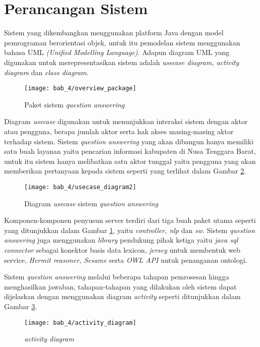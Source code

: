 \section{Perancangan Sistem}
Sistem yang dikembangkan menggunakan platform Java dengan model pemrograman berorientasi objek, untuk itu pemodelan sistem menggunakan bahasa UML \emph{(Unified Modelling Language)}. Adapun diagram UML yang digunakan untuk merepresentasikan sistem adalah \emph{usecase diagram, activity diagram} dan \emph{class diagram}.

\begin{figure}[hb]
    \centering
    \texttt{[image: bab\_4/overview\_package]}
    \caption{Paket sistem \emph{question answering}}
    \label{fig:overview_package}
\end{figure}

Diagram \emph{usecase} digunakan untuk menunjukkan interaksi sistem dengan aktor atau pengguna, berapa jumlah aktor serta hak akses masing-masing aktor terhadap sistem. Sistem \emph{question answering} yang akan dibangun hanya memiliki satu buah layanan yaitu pencarian informasi kabupaten di Nusa Tenggara Barat, untuk itu sistem hanya melibatkan satu aktor tunggal yaitu pengguna yang akan memberikan pertanyaan kepada sistem seperti yang terlihat dalam Gambar \ref{fig:usecase_diagram}.

\begin{figure}[ht]
    \centering
    \texttt{[image: bab\_4/usecase\_diagram2]}
    \caption{Diagram \emph{usecase} sistem \emph{question answering}}
    \label{fig:usecase_diagram}
\end{figure}

Komponen-komponen penyusun server terdiri dari tiga buah paket utama seperti yang ditunjukkan dalam Gambar \ref{fig:overview_package}, yaitu \emph{controller, nlp} dan \emph{sw}. Sistem \emph{question answering} juga menggunakan \emph{library} pendukung pihak ketiga yaitu \emph{java sql connector} sebagai konektor basis data lexicon, \emph{jersey} untuk membentuk web service, \emph{Hermit reasoner, Sesame} serta \emph{OWL API} untuk penanganan ontologi.

Sistem \emph{question answering} melalui beberapa tahapan pemrosesan hingga menghasilkan jawaban, tahapan-tahapan yang dilakukan oleh sistem dapat dijelaskan dengan menggunakan diagram \emph{activity} seperti ditunjukkan dalam Gambar \ref{fig:activity_diagram}.

\begin{figure}[hb]
    \centering
    \texttt{[image: bab\_4/activity\_diagram]}
    \caption{\emph{activity diagram}}
    \label{fig:activity_diagram}
\end{figure}


